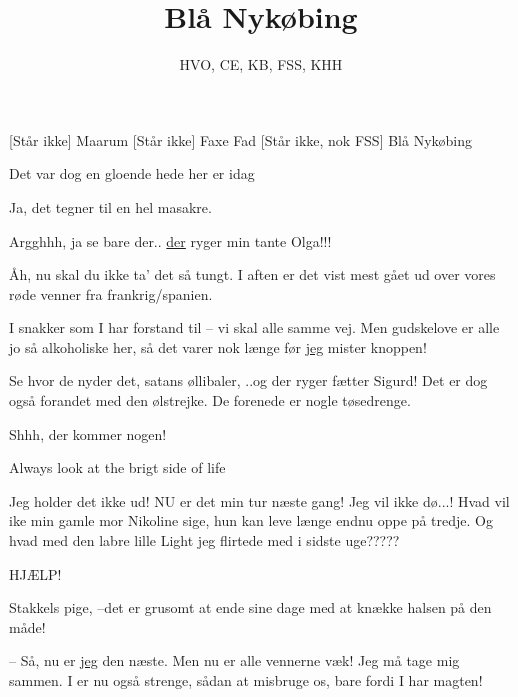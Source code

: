 \documentclass[a4paper,11pt]{article}
\title{Blå Nykøbing}
\author{HVO, CE, KB, FSS, KHH}
\begin{document}
\maketitle

\begin{roles}
[Står ikke] Maarum
[Står ikke] Faxe Fad
[Står ikke, nok FSS] Blå Nykøbing

\end{roles}

\begin{sketch}

 Det var dog en gloende hede her er idag

 Ja, det tegner til en hel masakre.


 Argghhh, ja se bare der..  \underline{der} ryger min tante Olga!!!

 Åh, nu skal du ikke ta' det så tungt. I aften er det vist mest gået ud
over vores røde venner fra frankrig/spanien.

 I snakker som I har forstand til -- vi skal alle samme vej. Men
gudskelove er alle jo så alkoholiske her, så det varer nok længe før
\underline{jeg} mister knoppen!

 Se hvor de nyder det, satans øllibaler, ..og der ryger fætter Sigurd!
Det er dog også forandet med den ølstrejke. De forenede er nogle tøsedrenge.

 Shhh, der kommer nogen!




 Always look at the brigt side of life


 Jeg holder det ikke ud! NU er det min tur næste gang! Jeg vil ikke
dø...! Hvad vil ike min gamle mor Nikoline sige, hun kan leve længe endnu oppe
på tredje. Og hvad med den labre lille Light jeg flirtede med i sidste uge?????



 HJÆLP!

  Stakkels pige, --det er grusomt at ende sine dage med
at knække halsen på den måde!

-- Så, nu er \underline{jeg} den næste. Men nu er alle vennerne væk! Jeg må tage
mig sammen. I er nu også strenge, sådan at misbruge os, bare fordi I har magten!
\end{sketch}
\end{document}
